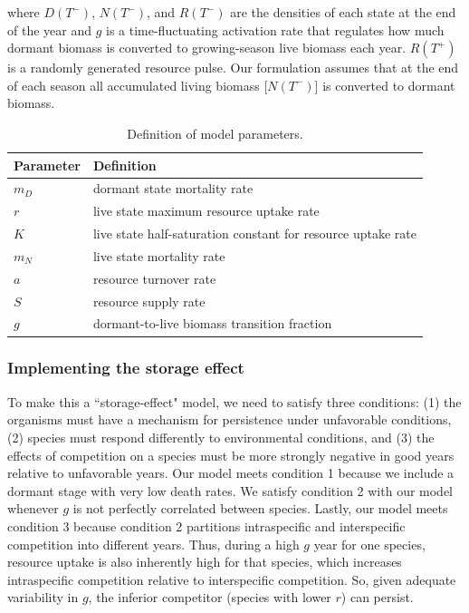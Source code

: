 \documentclass[12pt,]{article}
\begin{document}
where \(D(T^-)\), \(N(T^-)\), and \(R(T^-)\) are the densities of each
state at the end of the year and \(g\) is a time-fluctuating activation
rate that regulates how much dormant biomass is converted to
growing-season live biomass each year. \(R(T^+)\) is a randomly
generated resource pulse. Our formulation assumes that at the end of
each season all accumulated living biomass {[}\(N(T^-)\){]} is converted
to dormant biomass.

\begin{center}
\begin{table}
\caption{Definition of model parameters.}
\begin{tabular}{l l}
\hline
Parameter & Definition \\
\hline
$m_{D}$ & dormant state mortality rate \\
$r$ & live state maximum resource uptake rate \\
$K$ & live state half-saturation constant for resource uptake rate \\
$m_{N}$ & live state mortality rate \\
$a$ & resource turnover rate \\
$S$ & resource supply rate \\
$g$ & dormant-to-live biomass transition fraction \\ 
\hline
\end{tabular}
\end{table}
\end{center}

\subsubsection{Implementing the storage
effect}\label{implementing-the-storage-effect}

To make this a ``storage-effect" model, we need to satisfy three
conditions: (1) the organisms must have a mechanism for persistence
under unfavorable conditions, (2) species must respond differently to
environmental conditions, and (3) the effects of competition on a
species must be more strongly negative in good years relative to
unfavorable years. Our model meets condition 1 because we include a
dormant stage with very low death rates. We satisfy condition 2 with our
model whenever \(g\) is not perfectly correlated between species.
Lastly, our model meets condition 3 because condition 2 partitions
intraspecific and interspecific competition into different years. Thus,
during a high \(g\) year for one species, resource uptake is also
inherently high for that species, which increases intraspecific
competition relative to interspecific competition. So, given adequate
variability in \(g\), the inferior competitor (species with lower \(r\))
can persist.
\end{document}
